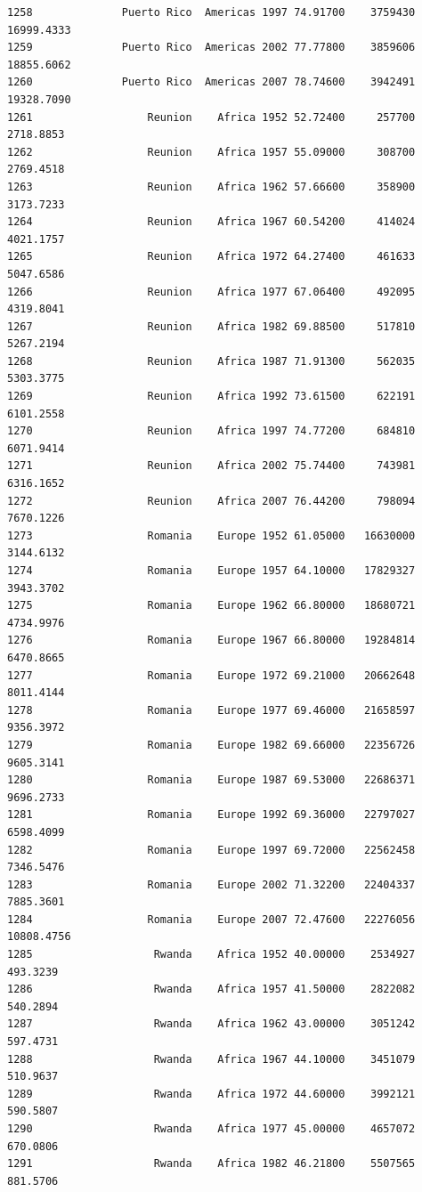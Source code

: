 \documentclass[
  letterpaper,
  DIV=11,
  numbers=noendperiod]{scrreprt}
\begin{document}
\begin{verbatim}
1258              Puerto Rico  Americas 1997 74.91700    3759430  16999.4333
1259              Puerto Rico  Americas 2002 77.77800    3859606  18855.6062
1260              Puerto Rico  Americas 2007 78.74600    3942491  19328.7090
1261                  Reunion    Africa 1952 52.72400     257700   2718.8853
1262                  Reunion    Africa 1957 55.09000     308700   2769.4518
1263                  Reunion    Africa 1962 57.66600     358900   3173.7233
1264                  Reunion    Africa 1967 60.54200     414024   4021.1757
1265                  Reunion    Africa 1972 64.27400     461633   5047.6586
1266                  Reunion    Africa 1977 67.06400     492095   4319.8041
1267                  Reunion    Africa 1982 69.88500     517810   5267.2194
1268                  Reunion    Africa 1987 71.91300     562035   5303.3775
1269                  Reunion    Africa 1992 73.61500     622191   6101.2558
1270                  Reunion    Africa 1997 74.77200     684810   6071.9414
1271                  Reunion    Africa 2002 75.74400     743981   6316.1652
1272                  Reunion    Africa 2007 76.44200     798094   7670.1226
1273                  Romania    Europe 1952 61.05000   16630000   3144.6132
1274                  Romania    Europe 1957 64.10000   17829327   3943.3702
1275                  Romania    Europe 1962 66.80000   18680721   4734.9976
1276                  Romania    Europe 1967 66.80000   19284814   6470.8665
1277                  Romania    Europe 1972 69.21000   20662648   8011.4144
1278                  Romania    Europe 1977 69.46000   21658597   9356.3972
1279                  Romania    Europe 1982 69.66000   22356726   9605.3141
1280                  Romania    Europe 1987 69.53000   22686371   9696.2733
1281                  Romania    Europe 1992 69.36000   22797027   6598.4099
1282                  Romania    Europe 1997 69.72000   22562458   7346.5476
1283                  Romania    Europe 2002 71.32200   22404337   7885.3601
1284                  Romania    Europe 2007 72.47600   22276056  10808.4756
1285                   Rwanda    Africa 1952 40.00000    2534927    493.3239
1286                   Rwanda    Africa 1957 41.50000    2822082    540.2894
1287                   Rwanda    Africa 1962 43.00000    3051242    597.4731
1288                   Rwanda    Africa 1967 44.10000    3451079    510.9637
1289                   Rwanda    Africa 1972 44.60000    3992121    590.5807
1290                   Rwanda    Africa 1977 45.00000    4657072    670.0806
1291                   Rwanda    Africa 1982 46.21800    5507565    881.5706

\end{verbatim}
\end{document}
